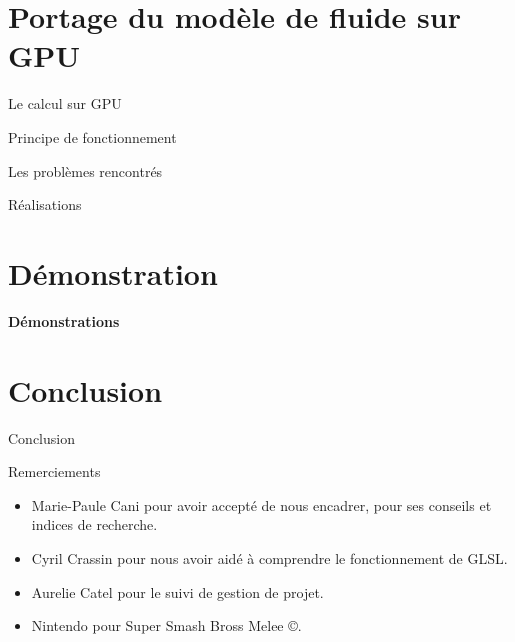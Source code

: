 \documentclass{beamer}
\begin{document}
\section{Portage du modèle de fluide sur GPU}
\begin{frame}{Le calcul sur GPU}
\end{frame}

\begin{frame}{Principe de fonctionnement}
\end{frame}

\begin{frame}{Les problèmes rencontrés}
\end{frame}

\begin{frame}{Réalisations}
\end{frame}

\section{Démonstration}
\begin{frame}
  \begin{center}
    \textbf{Démonstrations}
  \end{center}
\end{frame}

\section{Conclusion}
\begin{frame}{Conclusion}
\end{frame}

\begin{frame}{Remerciements}
  \begin{itemize}
  \item{Marie-Paule Cani} pour avoir accepté de nous encadrer, pour
    ses conseils et indices de recherche.
  \item{Cyril Crassin} pour nous avoir aidé à comprendre le
    fonctionnement de GLSL.
  \item{Aurelie Catel} pour le suivi de gestion de projet.
  \item{Nintendo\texttrademark} pour Super Smash Bross Melee ©.
  \end{itemize}
\end{frame}
\end{document}
